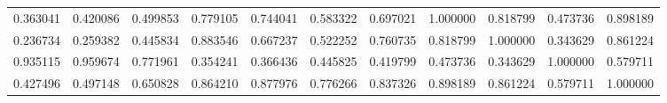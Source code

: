 \begin{table}
\begin{tabular}{lcr}
0.363041 & 0.420086 & 0.499853 & 0.779105 & 0.744041 & 0.583322 & 0.697021 & 1.000000 & 0.818799 & 0.473736 & 0.898189 \\
0.236734 & 0.259382 & 0.445834 & 0.883546 & 0.667237 & 0.522252 & 0.760735 & 0.818799 & 1.000000 & 0.343629 & 0.861224 \\
0.935115 & 0.959674 & 0.771961 & 0.354241 & 0.366436 & 0.445825 & 0.419799 & 0.473736 & 0.343629 & 1.000000 & 0.579711 \\
0.427496 & 0.497148 & 0.650828 & 0.864210 & 0.877976 & 0.776266 & 0.837326 & 0.898189 & 0.861224 & 0.579711 & 1.000000 \\
\bottomrule
\end{tabular}
\end{table}
